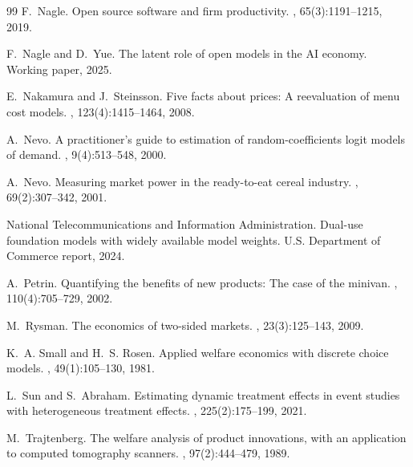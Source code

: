 \documentclass{article}
\begin{document}
\begin{thebibliography}{99}
F.~Nagle.
\newblock Open source software and firm productivity.
, 65(3):1191--1215, 2019.

F.~Nagle and D.~Yue.
\newblock The latent role of open models in the AI economy.
\newblock Working paper, 2025.

E.~Nakamura and J.~Steinsson.
\newblock Five facts about prices: A reevaluation of menu cost models.
, 123(4):1415--1464, 2008.

A.~Nevo.
\newblock A practitioner's guide to estimation of random-coefficients logit models of
  demand.
, 9(4):513--548, 2000.

A.~Nevo.
\newblock Measuring market power in the ready-to-eat cereal industry.
, 69(2):307--342, 2001.

National Telecommunications and Information Administration.
\newblock Dual-use foundation models with widely available model weights.
\newblock U.S. Department of Commerce report, 2024.

A.~Petrin.
\newblock Quantifying the benefits of new products: The case of the minivan.
, 110(4):705--729, 2002.

M.~Rysman.
\newblock The economics of two-sided markets.
, 23(3):125--143, 2009.

K.~A. Small and H.~S. Rosen.
\newblock Applied welfare economics with discrete choice models.
, 49(1):105--130, 1981.

L.~Sun and S.~Abraham.
\newblock Estimating dynamic treatment effects in event studies with heterogeneous
  treatment effects.
, 225(2):175--199, 2021.

M.~Trajtenberg.
\newblock The welfare analysis of product innovations, with an application to computed
  tomography scanners.
, 97(2):444--479, 1989.

\end{thebibliography}
\end{document}
